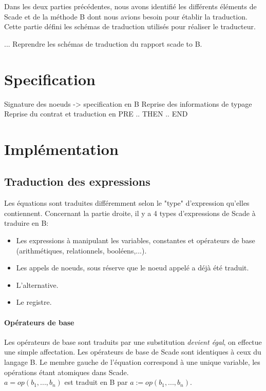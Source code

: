 


Dans les deux parties précédentes, nous avons identifié les différents
éléments de Scade et de la méthode B dont nous avions besoin pour
établir la traduction. Cette partie défini les schémas de traduction
utilisés pour réaliser le traducteur.


...
Reprendre les schémas de traduction du rapport scade to B.

\section{Specification}
Signature des noeuds -> specification en B
Reprise des informations de typage
Reprise du contrat et traduction en PRE .. THEN .. END


\section{Implémentation}

\subsection{Traduction des expressions}

Les équations sont traduites différemment selon le "type" d'expression qu'elles
contiennent.  
Concernant la partie droite, il y a 4 types d'expressions de Scade à traduire en B:
\begin{itemize}
\item Les expressions à manipulant les variables, constantes et opérateurs de
  base (arithmétiques, relationnels, booléens,...).
\item Les appels de noeuds, sous réserve que le noeud appelé a déjà été
  traduit. 
\item L'alternative.
\item Le registre.
\end{itemize}

\paragraph{Opérateurs de base}
Les opérateurs de base sont traduits par une substitution \emph{devient égal}, on
effectue une simple affectation. Les opérateurs de base de Scade sont identiques
à ceux du langage B. Le membre gauche de l'équation correspond à une unique
variable, les opérations étant atomiques dans Scade. \\
$a = op(b_1,...,b_n)$ est traduit en B par $a:=op(b_1,...,b_n)$. 


